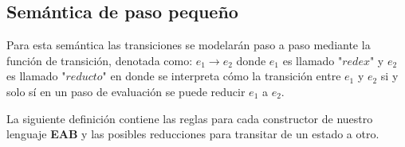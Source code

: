     \bigskip

    \subsection{Semántica de paso pequeño}
        Para esta semántica las transiciones se modelarán paso a paso mediante la función de transición, denotada como: $e_1 \rightarrow e_2$ donde $e_1$ es llamado "$redex$" y $e_2$ es llamado "$reducto$" en donde se interpreta cómo la transición entre $e_1$ y $e_2$ si y solo sí en un paso de evaluación se puede reducir $e_1$ a $e_2$.

        La siguiente definición contiene las reglas para cada constructor de nuestro lenguaje \textbf{EAB} y las posibles reducciones para transitar de un estado a otro.

    \bigskip

